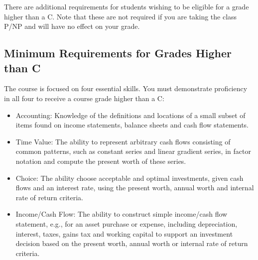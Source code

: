 \documentclass[letterpaper,10pt]{article}
\begin{document}




 There are additional requirements for students wishing to be eligible for a grade higher than a C.  Note that these are not required if you are taking the class P/NP and will have no effect on your grade.


 \subsection{Minimum Requirements for Grades Higher than C}
 
 The course is focused on four essential skills. You must
 demonstrate proficiency in all four to receive a course grade higher than a C:
 
 \begin{itemize}
 
 \item Accounting: Knowledge of the definitions and locations of a
   small subset of items found on income statements, balance sheets and
   cash flow statements.
 
 \item Time Value: The ability to represent arbitrary cash flows
   consisting of common patterns, such as constant series and linear
   gradient series, in factor notation and compute the present worth of
   these series.
 
 \item Choice: The ability choose acceptable and optimal investments,
   given cash flows and an interest rate, using the present worth,
   annual worth and internal rate of return criteria.
 
 \item Income/Cash Flow: The ability to construct simple income/cash
   flow statement, e.g., for an asset purchase or expense, including
   depreciation, interest, taxes, gains tax and working capital to
   support an investment decision based on the present worth, annual
   worth or internal rate of return criteria.
 \end{itemize}
 
\end{document}
